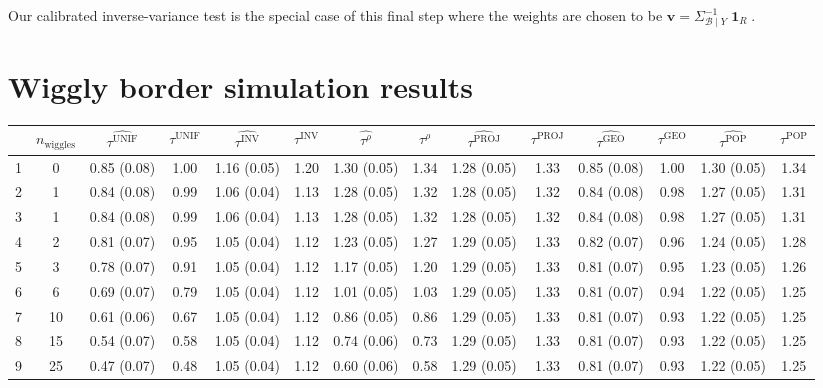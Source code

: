 \documentclass[letter]{article}
\DeclareMathOperator{\ones}{\mathbf{1}}
\newcommand{\vvec}{\mathbold{v}}
\newcommand{\border}{\mathcal{B}}
\newcommand{\unifavg}{\tau^{\mathrm{UNIF}}}
\newcommand{\invvar}{\tau^{\mathrm{INV}}}
\newcommand{\taurho}{\tau^{\rho}}
\newcommand{\tauproj}{\tau^{\mathrm{PROJ}}}
\newcommand{\taugeo}{\tau^{\mathrm{GEO}}}
\newcommand{\taupop}{\tau^{\mathrm{POP}}}
\newcommand{\numsent}{R}
\begin{document}
Our calibrated inverse-variance test is the special case of this final step where the weights are chosen to be \(\vvec = \Sigma^{-1}_{\border \mid Y} \ones_{\numsent}\).
    


    	\section{Wiggly border simulation results}\label{wiggly-border-simulation-results}
    

\begin{landscape}

\begin{table}
\begin{tabular}{r|ccccccccccccc}
	& $n_{\mathrm{wiggles}}$ & $\widehat{\unifavg}$ & $\unifavg$ & $\widehat{\invvar}$ & $\invvar$ & $\widehat{\taurho}$ & $\taurho$ & $\widehat{\tauproj}$ & $\tauproj$ & $\widehat{\taugeo}$ & $\taugeo$ & $\widehat{\taupop}$ & $\taupop$\\
		\hline
		1 & 0 & 0.85 (0.08) & 1.00 & 1.16 (0.05) & 1.20 & 1.30 (0.05) & 1.34 & 1.28 (0.05) & 1.33 & 0.85 (0.08) & 1.00 & 1.30 (0.05) & 1.34 \\
		2 & 1 & 0.84 (0.08) & 0.99 & 1.06 (0.04) & 1.13 & 1.28 (0.05) & 1.32 & 1.28 (0.05) & 1.32 & 0.84 (0.08) & 0.98 & 1.27 (0.05) & 1.31 \\
		3 & 1 & 0.84 (0.08) & 0.99 & 1.06 (0.04) & 1.13 & 1.28 (0.05) & 1.32 & 1.28 (0.05) & 1.32 & 0.84 (0.08) & 0.98 & 1.27 (0.05) & 1.31 \\
		4 & 2 & 0.81 (0.07) & 0.95 & 1.05 (0.04) & 1.12 & 1.23 (0.05) & 1.27 & 1.29 (0.05) & 1.33 & 0.82 (0.07) & 0.96 & 1.24 (0.05) & 1.28 \\
		5 & 3 & 0.78 (0.07) & 0.91 & 1.05 (0.04) & 1.12 & 1.17 (0.05) & 1.20 & 1.29 (0.05) & 1.33 & 0.81 (0.07) & 0.95 & 1.23 (0.05) & 1.26 \\
		6 & 6 & 0.69 (0.07) & 0.79 & 1.05 (0.04) & 1.12 & 1.01 (0.05) & 1.03 & 1.29 (0.05) & 1.33 & 0.81 (0.07) & 0.94 & 1.22 (0.05) & 1.25 \\
		7 & 10 & 0.61 (0.06) & 0.67 & 1.05 (0.04) & 1.12 & 0.86 (0.05) & 0.86 & 1.29 (0.05) & 1.33 & 0.81 (0.07) & 0.93 & 1.22 (0.05) & 1.25 \\
		8 & 15 & 0.54 (0.07) & 0.58 & 1.05 (0.04) & 1.12 & 0.74 (0.06) & 0.73 & 1.29 (0.05) & 1.33 & 0.81 (0.07) & 0.93 & 1.22 (0.05) & 1.25 \\
		9 & 25 & 0.47 (0.07) & 0.48 & 1.05 (0.04) & 1.12 & 0.60 (0.06) & 0.58 & 1.29 (0.05) & 1.33 & 0.81 (0.07) & 0.93 & 1.22 (0.05) & 1.25 \\

\end{tabular}
\end{table}
\end{landscape}
\end{document}
